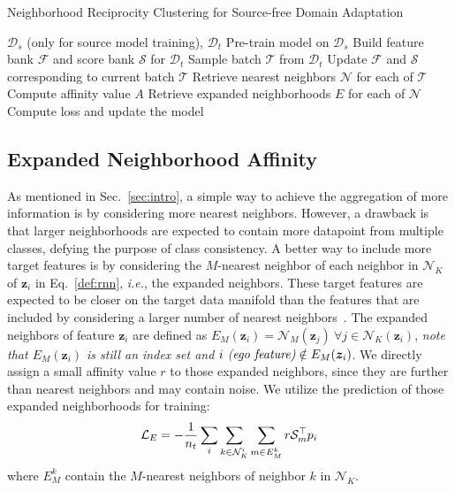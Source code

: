 \documentclass{article}
\begin{document}
{\small
\begin{algorithm}[t]
 	\footnotesize
	\caption{Neighborhood Reciprocity Clustering for Source-free Domain Adaptation}
	\label{alg:snr}
	\begin{algorithmic}[1]
		\Require $\mathcal{D}_s$ (only for source model training), $\mathcal{D}_t$ \State Pre-train model on $\mathcal{D}_s$
		\State Build feature bank $\mathcal{F}$ and score bank $\mathcal{S}$ for $\mathcal{D}_t$
		\State Sample batch $\mathcal{T}$ from $\mathcal{D}_t$ 
		\State Update $\mathcal{F}$ and $\mathcal{S}$ corresponding to current batch $\mathcal{T}$
		\State Retrieve nearest neighbors $\mathcal{N}$ for each of $\mathcal{T}$
		\State Compute affinity value $A$ 
		\State Retrieve expanded neighborhoods $E$ for each of $\mathcal{N}$ 
		\State Compute loss and update the model
\EndWhile 
	\end{algorithmic}
\end{algorithm}}
\vspace{-2mm}

\subsection{Expanded Neighborhood Affinity}\label{sec:expand}





As mentioned in Sec.~\ref{sec:intro}, a simple way to achieve the aggregation of more information is by considering more nearest neighbors. However, a drawback is that larger neighborhoods are expected to contain more datapoint from multiple classes, defying the purpose of class consistency. A better way to include more target features is by considering the $M$-nearest neighbor of each neighbor in $\mathcal{N}_K$ of $\bm{z}_i$ in Eq.~\ref{def:rnn}, \textit{i.e.}, the expanded neighbors. These target features are expected to be closer on the target data manifold than the features that are included by considering a larger number of nearest neighbors~\cite{tenenbaum2000global}.
The expanded neighbors of feature $\bm{z}_i$ are defined as $E_M(\bm{z}_i) = \mathcal{N}_M(\bm{z}_j)\ \forall j \in \mathcal{N}_K(\bm{z}_i)$, \textit{note that $E_M(\bm{z}_i)$ is still an index set and $i \text{\textit{ (ego feature)}} \notin E_M(\bm{z}_i)$}. 
We directly assign a small affinity value $r$ to those expanded neighbors, since they are further than nearest neighbors and may contain noise.
We utilize the prediction of those expanded neighborhoods for training:
\begin{eqnarray}\label{eq:nn2}
\small
    \mathcal{L}_{E}=-\frac{1}{n_t}\sum_{i}\sum_{k\in \mathcal{N}_K^i} \sum_{m\in {E}_M^k}r  \mathcal{S}_m^\top p_i
\end{eqnarray}
where ${E}_M^k$ contain the $M$-nearest neighbors of neighbor $k$ in $\mathcal{N}_K$. 
\end{document}
